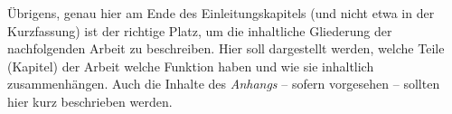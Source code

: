 Übrigens, genau hier am Ende des Einleitungskapitels (und nicht
etwa in der Kurzfassung) ist der richtige Platz, um die
inhaltliche Gliederung der nachfolgenden Arbeit zu beschreiben.
Hier soll dargestellt werden, welche Teile (Kapitel) der Arbeit
welche Funktion haben und wie sie inhaltlich zusammenhängen. Auch
die Inhalte des \emph{Anhangs} -- sofern vorgesehen -- sollten hier
kurz beschrieben werden.

